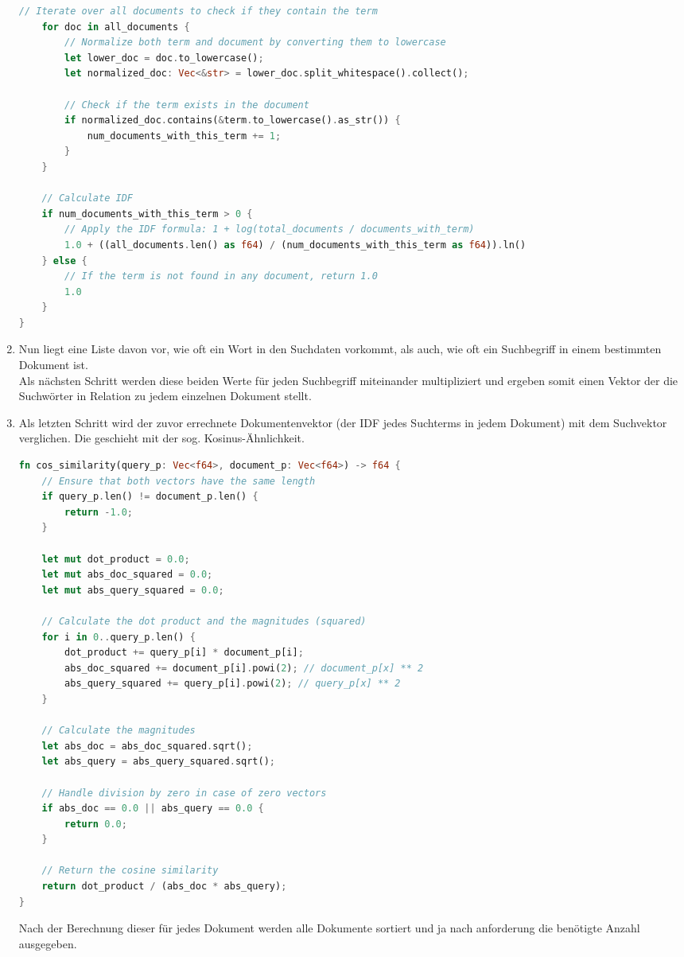 \begin{enumerate}
\begin{lstlisting}[language=Rust, caption={Berechnung der Inversen Dokumentenfrequenz}]
    // Iterate over all documents to check if they contain the term
    for doc in all_documents {
        // Normalize both term and document by converting them to lowercase
        let lower_doc = doc.to_lowercase();
        let normalized_doc: Vec<&str> = lower_doc.split_whitespace().collect();

        // Check if the term exists in the document
        if normalized_doc.contains(&term.to_lowercase().as_str()) {
            num_documents_with_this_term += 1;
        }
    }

    // Calculate IDF
    if num_documents_with_this_term > 0 {
        // Apply the IDF formula: 1 + log(total_documents / documents_with_term)
        1.0 + ((all_documents.len() as f64) / (num_documents_with_this_term as f64)).ln()
    } else {
        // If the term is not found in any document, return 1.0
        1.0
    }
}
\end{lstlisting}
     \item Nun liegt eine Liste davon vor, wie oft ein Wort in den Suchdaten vorkommt, als auch, wie oft ein Suchbegriff in einem bestimmten Dokument ist. \\ Als nächsten Schritt werden diese beiden Werte für jeden Suchbegriff miteinander multipliziert und ergeben somit einen Vektor der die Suchwörter in Relation zu jedem einzelnen Dokument stellt.
    \item Als letzten Schritt wird der zuvor errechnete Dokumentenvektor (der IDF jedes Suchterms in jedem Dokument) mit dem Suchvektor verglichen. Die geschieht mit der sog. Kosinus-Ähnlichkeit.
    \begin{lstlisting}[language=Rust, caption={Berechnung der Kosinusähnlichkeit}]
fn cos_similarity(query_p: Vec<f64>, document_p: Vec<f64>) -> f64 {
    // Ensure that both vectors have the same length
    if query_p.len() != document_p.len() {
        return -1.0;
    }

    let mut dot_product = 0.0;
    let mut abs_doc_squared = 0.0;
    let mut abs_query_squared = 0.0;

    // Calculate the dot product and the magnitudes (squared)
    for i in 0..query_p.len() {
        dot_product += query_p[i] * document_p[i];
        abs_doc_squared += document_p[i].powi(2); // document_p[x] ** 2
        abs_query_squared += query_p[i].powi(2); // query_p[x] ** 2
    }

    // Calculate the magnitudes
    let abs_doc = abs_doc_squared.sqrt();
    let abs_query = abs_query_squared.sqrt();

    // Handle division by zero in case of zero vectors
    if abs_doc == 0.0 || abs_query == 0.0 {
        return 0.0;
    }

    // Return the cosine similarity
    return dot_product / (abs_doc * abs_query);
}\end{lstlisting}
    Nach der Berechnung dieser für jedes Dokument werden alle Dokumente sortiert und ja nach anforderung die benötigte Anzahl ausgegeben.
\end{enumerate}

